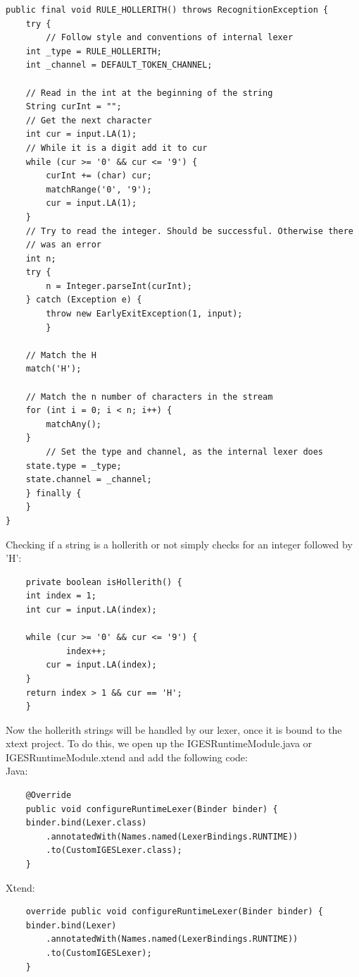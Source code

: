 \begin{Verbatim}
public final void RULE_HOLLERITH() throws RecognitionException {
    try {
        // Follow style and conventions of internal lexer
	int _type = RULE_HOLLERITH;
	int _channel = DEFAULT_TOKEN_CHANNEL;

	// Read in the int at the beginning of the string
	String curInt = "";
	// Get the next character
	int cur = input.LA(1);
	// While it is a digit add it to cur
	while (cur >= '0' && cur <= '9') {
	    curInt += (char) cur;
	    matchRange('0', '9');
	    cur = input.LA(1);
	}
	// Try to read the integer. Should be successful. Otherwise there
	// was an error
	int n;
	try {
	    n = Integer.parseInt(curInt);
	} catch (Exception e) {
	    throw new EarlyExitException(1, input);
        }

	// Match the H
	match('H');

	// Match the n number of characters in the stream
	for (int i = 0; i < n; i++) {
	    matchAny();
	}
        // Set the type and channel, as the internal lexer does
	state.type = _type;
	state.channel = _channel;
    } finally {
    }
}
\end{Verbatim}

Checking if a string is a hollerith or not simply checks for an integer followed by 'H':

\begin{Verbatim}
    private boolean isHollerith() {
	int index = 1;
	int cur = input.LA(index);

	while (cur >= '0' && cur <= '9') {
            index++;
	    cur = input.LA(index);
	}
	return index > 1 && cur == 'H';
    }
\end{Verbatim}

Now the hollerith strings will be handled by our lexer, once it is bound to the xtext project. To do this, we open up the IGESRuntimeModule.java or IGESRuntimeModule.xtend and add the following code:\\
Java:
\begin{Verbatim}
    @Override
    public void configureRuntimeLexer(Binder binder) {
	binder.bind(Lexer.class)
	    .annotatedWith(Names.named(LexerBindings.RUNTIME))
	    .to(CustomIGESLexer.class);
    }
\end{Verbatim}

Xtend:

\begin{Verbatim}
    override public void configureRuntimeLexer(Binder binder) {
	binder.bind(Lexer)
	    .annotatedWith(Names.named(LexerBindings.RUNTIME))
	    .to(CustomIGESLexer);
    }
\end{Verbatim}

